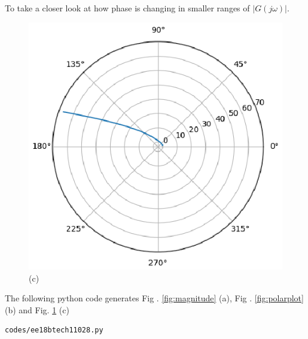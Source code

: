 \begin{enumerate}[label=\thesection.\arabic*.,ref=\thesection.\theenumi]
To take a closer look at how phase is changing in smaller ranges of $|G(j \omega)|$.
\begin{figure}[!h]
    \includegraphics[width=\columnwidth]{./figs/ee18btech11028/polar_plot2.eps}
  \caption{(c)}
  \label{fig:polarplot2}
\end{figure}

The following python code generates  Fig . \ref{fig:magnitude} (a), Fig . \ref{fig:polarplot} (b) and Fig. \ref{fig:polarplot2} (c)
\begin{lstlisting}
codes/ee18btech11028.py
\end{lstlisting}


\end{enumerate}
